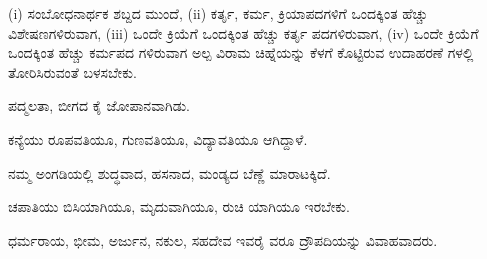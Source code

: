 \vspace{4pt plus 4pt minus 1pt}\hspace{0.5em}({\kbvlatin i}) ಸಂಬೋಧನಾರ್ಥಕ ಶಬ್ದದ ಮುಂದೆ, ({\kbvlatin ii}) ಕರ್ತೃ, ಕರ್ಮ, ಕ್ರಿಯಾಪದಗಳಿಗೆ ಒಂದಕ್ಕಿಂತ ಹೆಚ್ಚು ವಿಶೇಷಣಗಳಿರುವಾಗ, ({\kbvlatin iii}) ಒಂದೇ ಕ್ರಿಯೆಗೆ ಒಂದಕ್ಕಿಂತ ಹೆಚ್ಚು ಕರ್ತೃ ಪದಗಳಿರುವಾಗ, ({\kbvlatin iv}) ಒಂದೇ ಕ್ರಿಯೆಗೆ ಒಂದಕ್ಕಿಂತ ಹೆಚ್ಚು ಕರ್ಮಪದ ಗಳಿರುವಾಗ ಅಲ್ಪ ವಿರಾಮ ಚಿಹ್ನೆಯನ್ನು ಕೆಳಗೆ ಕೊಟ್ಟಿರುವ ಉದಾಹರಣೆ ಗಳಲ್ಲಿ ತೋರಿಸಿರುವಂತೆ ಬಳಸಬೇಕು.\par

\vspace{3pt plus 2pt}\noindent\hspace*{1.2em}\par\vspace{1pt}

\vspace{2.5pt plus 3pt minus 0.5pt}\noindent\hspace*{1.2em}\hspace{0.55em}ಪದ್ಮಲತಾ, ಬೀಗದ ಕೈ ಜೋಪಾನವಾಗಿಡು.\par

\vspace{2.5pt plus 3pt minus 0.5pt}\noindent\hspace*{1.2em}\hspace{0.55em}ಕನ್ಯೆಯು ರೂಪವತಿಯೂ, ಗುಣವತಿಯೂ, ವಿದ್ಯಾವತಿಯೂ ಆಗಿದ್ದಾಳೆ.\par

\vspace{2.5pt plus 3pt minus 0.5pt}\noindent\hspace*{1.2em}\hspace{0.55em}ನಮ್ಮ ಅಂಗಡಿಯಲ್ಲಿ ಶುದ್ಧವಾದ, ಹಸನಾದ, ಮಂಡ್ಯದ ಬೆಣ್ಣೆ ಮಾರಾಟಕ್ಕಿದೆ.\par

\vspace{2.5pt plus 3pt minus 0.5pt}\noindent\hspace*{1.2em}\hspace{0.55em}ಚಪಾತಿಯು ಬಿಸಿಯಾಗಿಯೂ, ಮೃದುವಾಗಿಯೂ, ರುಚಿ ಯಾಗಿಯೂ ಇರಬೇಕು.\par

\vspace{2.5pt plus 3pt minus 0.5pt}\noindent\hspace*{1.2em}\hspace{0.55em}ಧರ್ಮರಾಯ, ಭೀಮ, ಅರ್ಜುನ, ನಕುಲ, ಸಹದೇವ ಇವರೈ ವರೂ ದ್ರೌಪದಿಯನ್ನು ವಿವಾಹವಾದರು.\par

